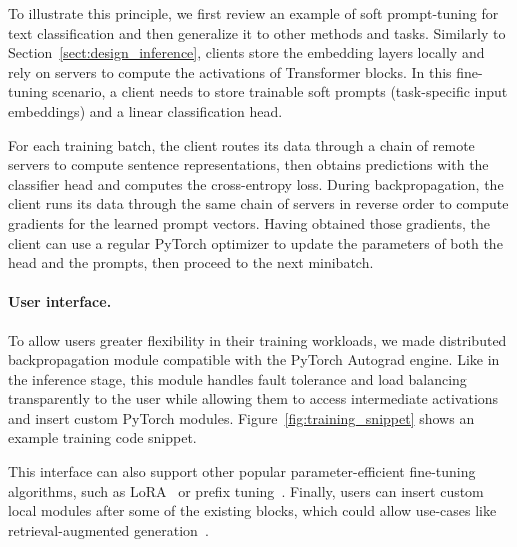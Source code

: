 
To illustrate this principle, we first review an example of soft prompt-tuning for text classification and then generalize it to other methods and tasks.
Similarly to Section~\ref{sect:design_inference}, clients store the embedding layers locally and rely on servers to compute the activations of Transformer blocks. In this fine-tuning scenario, a client needs to store trainable soft prompts (task-specific input embeddings) and a linear classification head. 

For each training batch, the client routes its data through a chain of remote servers to compute sentence representations, then obtains predictions with the classifier head and computes the cross-entropy loss.
During backpropagation, the client runs its data through the same chain of servers in reverse order to compute gradients for the learned prompt vectors. Having obtained those gradients, the client can use a regular PyTorch optimizer to update the parameters of both the head and the prompts, then proceed to the next minibatch.

\paragraph{User interface.} To allow users greater flexibility in their training workloads, we made distributed backpropagation module compatible with the PyTorch Autograd engine. Like in the inference stage, this module handles fault tolerance and load balancing transparently to the user while allowing them to access intermediate activations and insert custom PyTorch modules. Figure~\ref{fig:training_snippet} shows an example training code snippet.

This interface can also support other popular parameter-efficient fine-tuning algorithms, such as LoRA~\citep{hu2021lora} or prefix tuning~\citep{li-liang-2021-prefix}. Finally, users can insert custom local modules after some of the  existing blocks, which could allow use-cases like retrieval-augmented generation~\citep{retro,rag}.%

